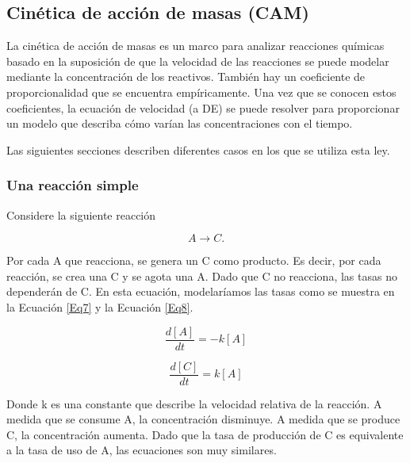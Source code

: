 \documentclass[11pt, letterpaper, spanish]{article}
\begin{document}
{      \subsection{Cinética de acción de masas (CAM)}
    
    \par{La cinética de acción de masas es un marco para analizar reacciones químicas basado en la suposición de que la velocidad de las reacciones se puede modelar mediante la concentración de los reactivos. También hay un coeficiente de proporcionalidad que se encuentra empíricamente. Una vez que se conocen estos coeficientes, la ecuación de velocidad (a DE) se puede resolver para proporcionar un modelo que describa cómo varían las concentraciones con el tiempo.}
     \par{Las siguientes secciones describen diferentes casos en los que se utiliza esta ley.}
      \subsubsection{Una reacción simple}

    \par{Considere la siguiente reacción}

    \begin{equation}
        A \rightarrow C.
    \end{equation}

    \par{Por cada A que reacciona, se genera un C como producto. Es decir, por cada reacción, se crea una C y se agota una A. Dado que C no reacciona, las tasas no dependerán de C. En esta ecuación, modelaríamos las tasas como se muestra en la Ecuación \ref{Eq7} y la Ecuación \ref{Eq8}. }

    \begin{equation}
        \frac{d [A]}{d t}=-k[A]
        \label{Eq7}
    \end{equation}

    \begin{equation}
        \frac{d [C]}{d t}=k[A]
        \label{Eq8}
    \end{equation}

    \par{Donde k es una constante que describe la velocidad relativa de la reacción. A medida que se consume A, la concentración disminuye. A medida que se produce C, la concentración aumenta. Dado que la tasa de producción de C es equivalente a la tasa de uso de A, las ecuaciones son muy similares.}

}
\end{document}
